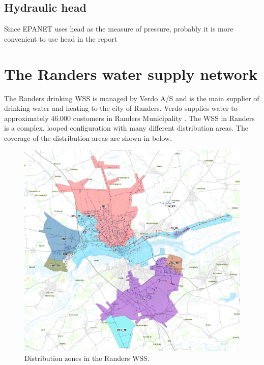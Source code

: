 \subsection{Hydraulic head}
\label{hydraulic_head}
Since EPANET uses head as the measure of pressure, probably it is more convenient to use head in the report

\newpage

\section{The Randers water supply network}
\label{the_randers_water_supply_network}

The Randers drinking WSS is managed by Verdo A/S and is the main supplier of drinking water and heating to the city of Randers. Verdo supplies water to approximately 46.000 customers in Randers Municipality \cite{verdo}. The WSS in Randers is a complex, looped configuration with many different distribution areas. The coverage of the distribution areas are shown in  below.

\begin{figure}[H]
\centering
\includegraphics[width=1\textwidth]{report/pictures/level_zones}
\caption{Distribution zones in the Randers WSS.}
\label{fig:level_zones}
\end{figure}

